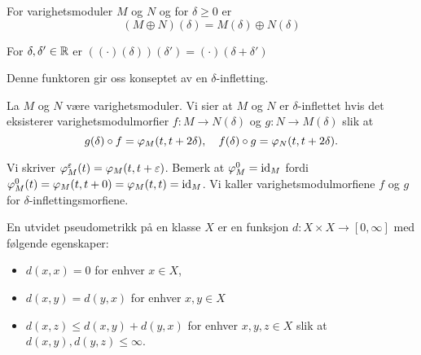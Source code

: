 \begin{lemma}\label{lem:DSShiftSplit}
  For varighetsmoduler $M$ og $N$ og for $\delta\geq0$ er
  \[(M\oplus N)(\delta) = M(\delta)\oplus N(\delta)\]
\end{lemma}

\begin{proposisjon}\label{kor:Shiftpluss}
For $\delta,\delta'\in\mathbb{R}$ er
  $((\cdot)(\delta))(\delta')=(\cdot)(\delta+\delta')$
\end{proposisjon}

Denne funktoren gir oss konseptet av en $\delta$-infletting.

\begin{definisjon}\label{Def:infletting}
	La $M$ og $N$ være varighetsmoduler. Vi sier at $M$ og
  $N$ er $\delta$-inflettet hvis det eksisterer
  varighetsmodulmorfier $f:M\to N(\delta)$ og $g:N\to
  M(\delta)$ slik at
	\[g(\delta)\circ f = \varphi_M(t,t+2\delta),\quad
  f(\delta)\circ g = \varphi_N(t,t+2\delta).\]
\end{definisjon}
Vi skriver $\varphi^\varepsilon_M(t) = \varphi_M(t,t+\varepsilon)$. Bemerk at
$\varphi^0_M=\textnormal{id}_M$ fordi $\varphi^0_M(t)
= \varphi_M(t,t+0)=\varphi_M(t,t)=\textnormal{id}_M$. Vi kaller
varighetsmodulmorfiene $f$ og $g$ for
$\delta$-inflettingsmorfiene.

\begin{definisjon}\label{def:UtPsMet}
   En utvidet pseudometrikk på en klasse $X$ er en
   funksjon $d: X\times X\to [0,\infty]$ med følgende
   egenskaper:
   \begin{itemize}
     \item $d(x,x) = 0$ for enhver $x\in X$,
     \item $d(x,y) = d(y,x)$ for enhver $x,y\in X$
     \item $d(x,z) \leq d(x,y) + d(y,x)$ for enhver
       $x,y,z\in X$ slik at $d(x,y),d(y,z)\leq\infty$.
   \end{itemize}
\end{definisjon}

